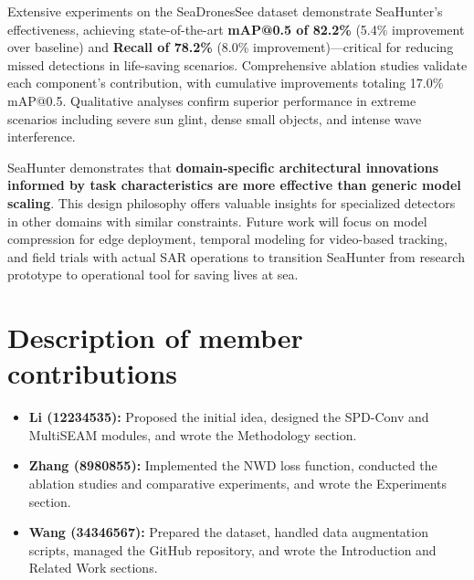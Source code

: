\documentclass[lettersize,journal]{IEEEtran}
\begin{document}
Extensive experiments on the SeaDronesSee dataset demonstrate SeaHunter's effectiveness, achieving state-of-the-art \textbf{mAP@0.5 of 82.2\%} (5.4\% improvement over baseline) and \textbf{Recall of 78.2\%} (8.0\% improvement)—critical for reducing missed detections in life-saving scenarios. Comprehensive ablation studies validate each component's contribution, with cumulative improvements totaling 17.0\% mAP@0.5. Qualitative analyses confirm superior performance in extreme scenarios including severe sun glint, dense small objects, and intense wave interference.

SeaHunter demonstrates that \textbf{domain-specific architectural innovations informed by task characteristics are more effective than generic model scaling}. This design philosophy offers valuable insights for specialized detectors in other domains with similar constraints. Future work will focus on model compression for edge deployment, temporal modeling for video-based tracking, and field trials with actual SAR operations to transition SeaHunter from research prototype to operational tool for saving lives at sea.

\section{Description of member contributions}
\label{sec:contribution}
\begin{itemize}
    \item \textbf{Li (12234535):} Proposed the initial idea, designed the SPD-Conv and MultiSEAM modules, and wrote the Methodology section.
    \item \textbf{Zhang (8980855):} Implemented the NWD loss function, conducted the ablation studies and comparative experiments, and wrote the Experiments section.
    \item \textbf{Wang (34346567):} Prepared the dataset, handled data augmentation scripts, managed the GitHub repository, and wrote the Introduction and Related Work sections.
\end{itemize}
\end{document}

